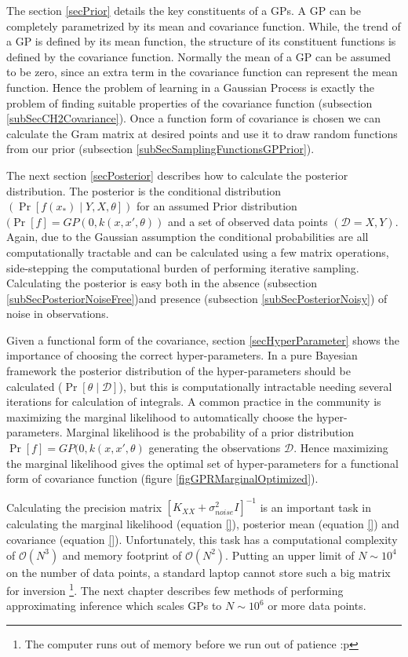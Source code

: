 The section \ref{secPrior} details the key constituents of a GPs. A GP can be completely parametrized by its mean and covariance function. While, the trend of a GP is defined by its mean function, the structure of its constituent functions is defined by the covariance function. Normally the mean of a GP can be assumed to be zero, since an extra term in the covariance function can represent the mean function. Hence the problem of learning in a Gaussian Process is exactly the problem of finding suitable properties of the covariance function (subsection \ref{subSecCH2Covariance}). Once a function form of covariance is chosen we can calculate the Gram matrix at desired points and use it to draw random functions from our prior (subsection \ref{subSecSamplingFunctionsGPPrior}). 

The next section \ref{secPosterior} describes how to calculate the posterior distribution. The posterior is the conditional distribution \((\Pr[f(x_{*}) \mid Y, X, \theta])\) for an assumed Prior distribution \((\Pr[f] = GP(0, k(x, x', \theta))\) and a set of observed data points \((\mathcal{D} = {X, Y})\). Again, due to the Gaussian assumption the conditional probabilities are all computationally tractable and can be calculated using a few matrix operations, side-stepping the computational burden of performing iterative sampling. Calculating the posterior is easy both in the absence (subsection \ref{subSecPosteriorNoiseFree})and presence (subsection \ref{subSecPosteriorNoisy}) of noise in observations. 

Given a functional form of the covariance, section \ref{secHyperParameter} shows the importance of choosing the correct hyper-parameters. In a pure Bayesian framework the posterior distribution of the hyper-parameters should be calculated (\(\Pr[\theta \mid \mathcal{D}]\)), but this is computationally intractable needing several iterations for calculation of integrals. A common practice in the community is maximizing the marginal likelihood to automatically choose the hyper-parameters. Marginal likelihood is the probability of a prior distribution \(\Pr[f] = GP(0, k(x, x', \theta)\) generating the observations \(\mathcal{D}\). Hence maximizing the marginal likelihood gives the optimal set of hyper-parameters for a functional form of covariance function (figure \ref{figGPRMarginalOptimized}). 

Calculating the precision matrix \([K_{XX}+ \sigma_{noise}^{2}I]^{-1}\) is an important task in calculating the marginal likelihood (equation \ref{}), posterior mean (equation \ref{}) and covariance (equation \ref{}). Unfortunately, this task has a computational complexity of \(\mathcal{O}\left ( N^{3} \right )\) and memory footprint of \(\mathcal{O}\left ( N^{2} \right )\). Putting an upper limit of \(N \sim 10^4\) on the number of data points, a standard laptop cannot store such a big matrix for inversion \footnote{The computer runs out of memory before we run out of patience :p}. The next chapter describes few methods of performing approximating inference which scales GPs to \(N \sim 10^6\) or more data points. 